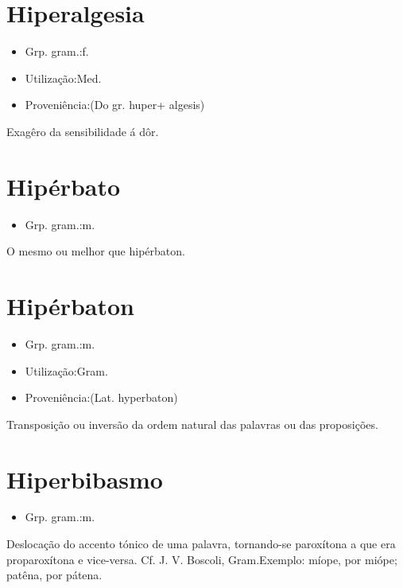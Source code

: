 \documentclass{article}
\begin{document}
\section{Hiperalgesia}
\begin{itemize}
\item {Grp. gram.:f.}
\end{itemize}
\begin{itemize}
\item {Utilização:Med.}
\end{itemize}
\begin{itemize}
\item {Proveniência:(Do gr. \textunderscore huper\textunderscore  + \textunderscore algesis\textunderscore )}
\end{itemize}
Exagêro da sensibilidade á dôr.
\section{Hipérbato}
\begin{itemize}
\item {Grp. gram.:m.}
\end{itemize}
O mesmo ou melhor que \textunderscore hipérbaton\textunderscore .
\section{Hipérbaton}
\begin{itemize}
\item {Grp. gram.:m.}
\end{itemize}
\begin{itemize}
\item {Utilização:Gram.}
\end{itemize}
\begin{itemize}
\item {Proveniência:(Lat. \textunderscore hyperbaton\textunderscore )}
\end{itemize}
Transposição ou inversão da ordem natural das palavras ou das proposições.
\section{Hiperbibasmo}
\begin{itemize}
\item {Grp. gram.:m.}
\end{itemize}
Deslocação do accento tónico de uma palavra, tornando-se paroxítona a que era proparoxítona e vice-versa. Cf. J. V. Boscoli, \textunderscore Gram.\textunderscore  Exemplo: \textunderscore míope\textunderscore , por \textunderscore miópe\textunderscore ; \textunderscore patêna\textunderscore , por \textunderscore pátena\textunderscore .
\end{document}
